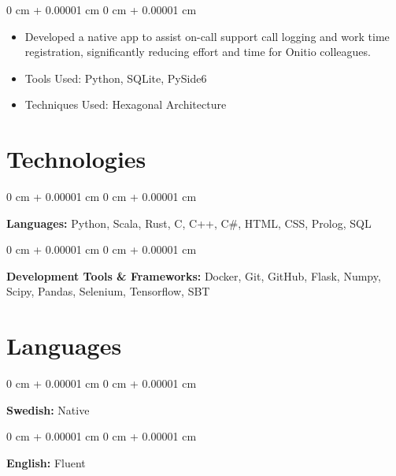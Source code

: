 \documentclass[10pt, letterpaper]{article}
\newenvironment{highlights}{
    \begin{itemize}[
        topsep=0.10 cm,
        parsep=0.10 cm,
        partopsep=0pt,
        itemsep=0pt,
        leftmargin=0 cm + 10pt
    ]
}{
    \end{itemize}
} %
\newenvironment{onecolentry}{
    \begin{adjustwidth}{
        0 cm + 0.00001 cm
    }{
        0 cm + 0.00001 cm
    }
}{
    \end{adjustwidth}
} %
\begin{document}
        \vspace{0.10 cm}
        \begin{onecolentry}
            \begin{highlights}
                \item Developed a native app to assist on-call support call logging and work time registration, significantly reducing effort and time for Onitio colleagues.
                \item Tools Used: Python, SQLite, PySide6
                \item Techniques Used: Hexagonal Architecture
            \end{highlights}
        \end{onecolentry}



    
    \section{Technologies}



        
        \begin{onecolentry}
            \textbf{Languages:} Python, Scala, Rust, C, C++, C\#, HTML, CSS, Prolog, SQL
        \end{onecolentry}

        \vspace{0.2 cm}

        \begin{onecolentry}
            \textbf{Development Tools \& Frameworks:} Docker, Git, GitHub, Flask, Numpy, Scipy, Pandas, Selenium, Tensorflow, SBT
        \end{onecolentry}


    
    \section{Languages}



        
        \begin{onecolentry}
            \textbf{Swedish:} Native
        \end{onecolentry}

        \vspace{0.2 cm}

        \begin{onecolentry}
            \textbf{English:} Fluent
        \end{onecolentry}


    
\end{document}
